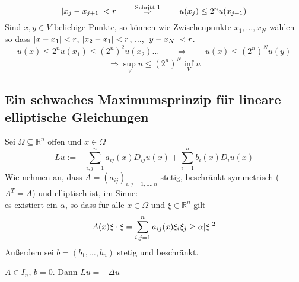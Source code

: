 \begin{beweis}
\begin{description}
		\begin{equation}
			\lvert x_j - x_{j+1}\rvert < r \qquad \stackrel{\text{Schritt }1}{\Rightarrow } \qquad u(x_j) \leq 2^n u(x_{j+1})
		\end{equation}
		Sind $x,y \in V$ beliebige Punkte, so können wie Zwischenpunkte $x_1,\dots,x_N$ wählen so dass $\lvert x-x_1\rvert<r$, $\lvert x_2-x_1\rvert<r$, $\dots$, $\lvert y-x_N\rvert<r$.
		\begin{equation}
			u(x) \leq 2^n u(x_1) \leq (2^n)^2 u(x_2) \dots \qquad \Rightarrow  \qquad u(x) \leq \left(2^n \right)^N u(y)
		\end{equation} 
		\begin{equation}
			\Rightarrow \sup_V u \leq \left( 2^n \right)^N \inf_{V}u
		\end{equation}
	\end{description}
\end{beweis}
\subsection{Ein schwaches Maximumsprinzip für lineare elliptische Gleichungen} 
\label{sub:ein_schwaches_maximumsprinzip_fur_lineare_elliptische_gleichungen}
Sei $\Omega \subseteq \mathbb{R}^n$ offen und $x \in \Omega$
\[
	Lu := - \sum^{n}_{i,j=1}a_{ij}(x)D_{ij}u(x) + \sum^{n}_{i=1}b_i(x)D_iu(x)
\]
Wie nehmen an, dass $A= (a_{ij})_{i,j=1,\dots,n}$ stetig, beschränkt symmetrisch ($A^T = A$) und elliptisch ist, im Sinne: \\
es existiert ein $\alpha$, so dass für alle $x \in \Omega$ und $\xi \in \mathbb{R}^n$ gilt
\[
	A(x) \xi \cdot \xi  = \sum^{n}_{i,j=1} a_{ij}(x)\xi_i\xi_j \geq \alpha \lvert\xi\rvert^2
\]
Außerdem sei $b=(b_1,\dots,b_n)$ stetig und beschränkt.
\begin{bemerkung}
	$A \in I_n$, $b=0$. Dann $Lu= - \Delta u$
\end{bemerkung}

